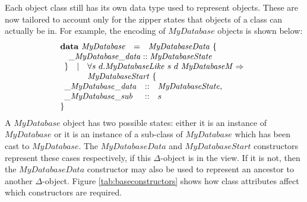 Each object class still has its own data type used to represent objects. These are now tailored to account only for the zipper states that objects of a class can actually be in. For example, the encoding of $\mathit{MyDatabase}$ objects is shown below: 
\begin{displaymath}
\begin{array}{lcl}
\mathbf{data}~\mathit{MyDatabase} & = & \mathit{MyDatabaseData}~\{ \\ 
\multicolumn{3}{l}{\quad \_\mathit{MyDatabase}\_\mathit{data} :: \mathit{MyDatabaseState}}\\
\multicolumn{3}{l}{\begin{array}{lcl}
    \} & \mid & \forall s~d.\mathit{MyDatabaseLike}~s~d~\mathit{MyDatabaseM} \Rightarrow \\
    & &  \mathit{MyDatabaseStart}~\{
    \end{array}}  \\
\multicolumn{3}{l}{\begin{array}{lcl}
    \_\mathit{MyDatabase}\_\mathit{data} & :: & \mathit{MyDatabaseState},\\
    \_\mathit{MyDatabase}\_\mathit{sub}  & :: & s
    \end{array}}\\
\} &&
\end{array}
\end{displaymath}
A $\mathit{MyDatabase}$ object has two possible states: either it is an instance of $\mathit{MyDatabase}$ or it is an instance of a sub-class of $\mathit{MyDatabase}$ which has been cast to $\mathit{MyDatabase}$. The $\mathit{MyDatabaseData}$ and $\mathit{MyDatabaseStart}$ constructors represent these cases respectively, if this $\Delta$-object is in the view. If it is not, then the $\mathit{MyDatabaseData}$ constructor may also be used to represent an ancestor to another $\Delta$-object. Figure \ref{tab:baseconstructors} shows how class attributes affect which constructors are required.

